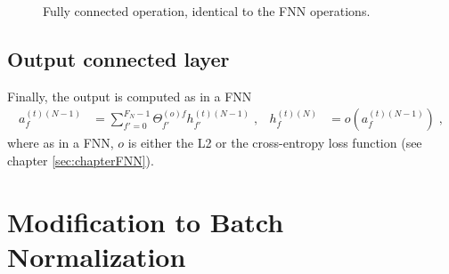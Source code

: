 \begin{figure}[H]
\begin{center}
\caption{Fully connected operation, identical to the FNN operations.}
\end{center}
\end{figure}

\subsection{Output connected layer}

Finally, the output is computed as in a FNN
\begin{align}
a_{f}^{(t)(N-1)}&=\sum^{F_{N}-1}_{f'=0}\Theta^{(o)f}_{f'}h^{(t)(N-1)}_{f'}\;,
&
h_{f}^{(t)(N)}&=o\left(a_{f}^{(t)(N-1)}\right)\;,
\end{align}
where as in a FNN, $o$ is either the L2 or the cross-entropy loss function (see chapter \ref{sec:chapterFNN}). 

\section{Modification to Batch Normalization}


